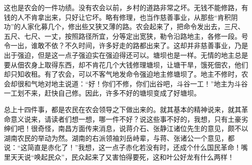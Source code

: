 这也是农会的一件功绩。没有农会以前，乡村的道路非常之坏。无钱不能修路，有钱的人不肯拿出来，只好让它坏。略有修理，也当作慈善事业，从那些“肯积阴功”的人家化募几个，修出些又狭又薄的路。农会起来了，把命令发出去，三尺、五尺、七尺、一丈，按照路径所宜，分等定出宽狭，勒令沿路地主，各修一段。号令一出，谁敢不依？不久时间，许多好走的路都出来了。这却并非慈善事业，乃是出于强迫，但是这一点子强迫实在强迫得还可以。塘坝也是一样。无情的地主总是要从佃农身上取得东西，却不肯花几个大钱修理塘坝，让塘干旱，饿死佃农，他们却只知收租。有了农会，可以不客气地发命令强迫地主修塘坝了。地主不修时，农会却很和气地对地主说道：“好！你们不修，你们出谷吧，斗谷一工！”地主为斗谷一工划不来，赶快自己修。因此，许多不好的塘坝变成了好塘坝。

总上十四件事，都是农民在农会领导之下做出来的。就其基本的精神说来，就其革命意义说来，请读者们想一想，哪一件不好？说这些事不好的，我想，只有土豪劣绅们吧！很奇怪，南昌方面传来消息，说蒋介石、张静江诸位先生的意见，颇不以湖南农民的举动为然。湖南的右派领袖刘岳峙辈，与蒋、张诸公一个意见，都说：“这简直是赤化了！”我想，这一点子赤化若没有时，还成个什么国民革命！嘴里天天说“唤起民众”，民众起来了又害怕得要死，这和叶公好龙有什么两样！


